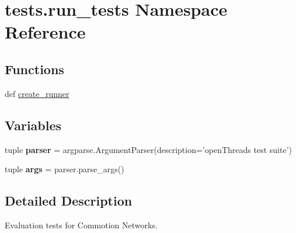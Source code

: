 \hypertarget{namespacetests_1_1run__tests}{\section{tests.\+run\+\_\+tests Namespace Reference}
\label{namespacetests_1_1run__tests}
}
\subsection*{Functions}
\begin{DoxyCompactItemize}
\item 
def \hyperlink{namespacetests_1_1run__tests_a89c91ae48d760f119a2d16441f8a2d01}{create\+\_\+runner}
\end{DoxyCompactItemize}
\subsection*{Variables}
\begin{DoxyCompactItemize}
\item 
\hypertarget{namespacetests_1_1run__tests_a9589a243fcfd62aff67b19214974bc74}{tuple {\bfseries parser} = argparse.\+Argument\+Parser(description='open\+Threads test suite')}\label{namespacetests_1_1run__tests_a9589a243fcfd62aff67b19214974bc74}

\item 
\hypertarget{namespacetests_1_1run__tests_a600052a32daf91fd45feebcb45741d42}{tuple {\bfseries args} = parser.\+parse\+\_\+args()}\label{namespacetests_1_1run__tests_a600052a32daf91fd45feebcb45741d42}

\end{DoxyCompactItemize}


\subsection{Detailed Description}
\begin{DoxyVerb}Evaluation tests for Commotion Networks.\end{DoxyVerb}
 

